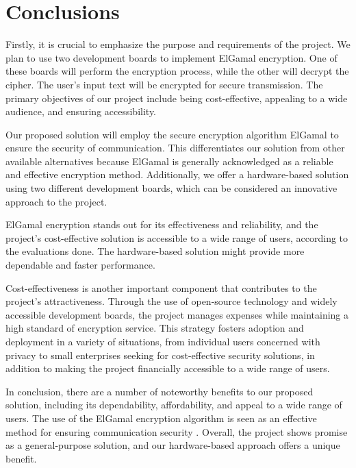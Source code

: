 \documentclass[12pt]{article}
\begin{document}
 	\newpage
 		\section{Conclusions}
	
	Firstly, it is crucial to emphasize the purpose and requirements of the project. We plan to use two development boards to implement ElGamal encryption. One of these boards will perform the encryption process, while the other will decrypt the cipher. The user's input text will be encrypted for secure transmission. The primary objectives of our project include being cost-effective, appealing to a wide audience, and ensuring accessibility.\cite{koblitz2012course}

	
	Our proposed solution will employ the secure encryption algorithm ElGamal to ensure the security of communication. This differentiates our solution from other available alternatives because ElGamal is generally acknowledged as a reliable and effective encryption method\cite{mollin2001introduction}. Additionally, we offer a hardware-based solution using two different development boards, which can be considered an innovative approach to the project.
	
	ElGamal encryption stands out for its effectiveness and reliability, and the project's cost-effective solution is accessible to a wide range of users, according to the evaluations done. The hardware-based solution might provide more dependable and faster performance.
	
Cost-effectiveness is another important component that contributes to the project's attractiveness. Through the use of open-source technology and widely accessible development boards, the project manages expenses while maintaining a high standard of encryption service. This strategy fosters adoption and deployment in a variety of situations, from individual users concerned with privacy to small enterprises seeking for cost-effective security solutions, in addition to making the project financially accessible to a wide range of users.
	
In conclusion, there are a number of noteworthy benefits to our proposed solution, including its dependability, affordability, and appeal to a wide range of users. The use of the ElGamal encryption algorithm is seen as an effective method for ensuring communication security	\cite{van1999fundamentals}. Overall, the project shows promise as a general-purpose solution, and our hardware-based approach offers a unique benefit.
	\newpage
\end{document}
